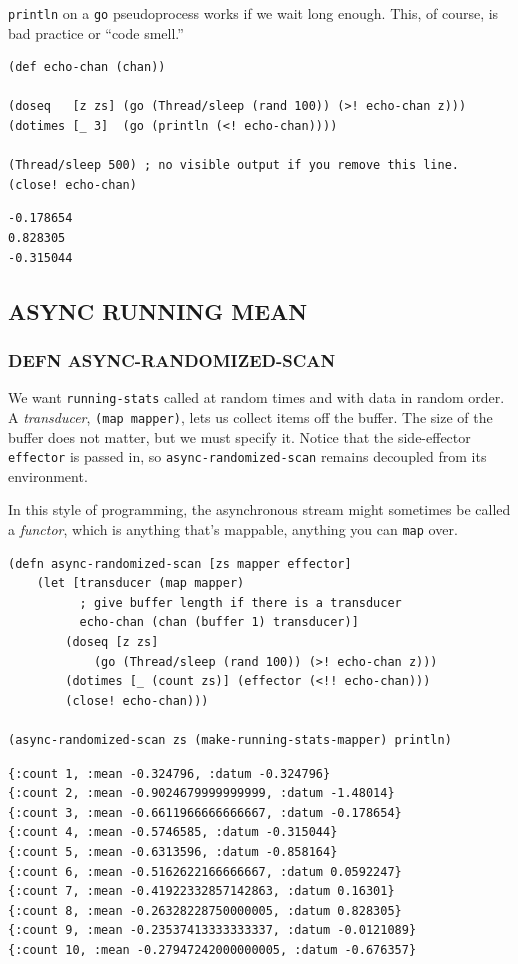 \documentclass[10pt,oneside,x11names]{article}
\begin{document}
\texttt{println} on a \texttt{go} pseudoprocess works if we wait long enough. This, of
course, is bad practice or ``code smell.''

\begin{verbatim}
(def echo-chan (chan))

(doseq   [z zs] (go (Thread/sleep (rand 100)) (>! echo-chan z)))
(dotimes [_ 3]  (go (println (<! echo-chan))))

(Thread/sleep 500) ; no visible output if you remove this line.
(close! echo-chan)
\end{verbatim}

\begin{verbatim}
-0.178654
0.828305
-0.315044
\end{verbatim}

\subsection{ASYNC RUNNING MEAN}
\label{async-running-mean}
\subsubsection{DEFN ASYNC-RANDOMIZED-SCAN}
\label{async-randomized-scan}
We want \texttt{running-stats} called at random times and with data in random
order. A \emph{transducer}, \texttt{(map mapper)}, lets us collect items off the
buffer. The size of the buffer does not matter, but we must specify it.
Notice that the side-effector \texttt{effector} is passed in, so
\texttt{async-randomized-scan} remains decoupled from its environment.

In this style of programming, the asynchronous stream might sometimes be
called a \emph{functor}, which is anything that's mappable, anything you can
\texttt{map} over.

\begin{verbatim}
(defn async-randomized-scan [zs mapper effector]
    (let [transducer (map mapper)
          ; give buffer length if there is a transducer
          echo-chan (chan (buffer 1) transducer)]
        (doseq [z zs]
            (go (Thread/sleep (rand 100)) (>! echo-chan z)))
        (dotimes [_ (count zs)] (effector (<!! echo-chan)))
        (close! echo-chan)))

(async-randomized-scan zs (make-running-stats-mapper) println)
\end{verbatim}

\begin{verbatim}
{:count 1, :mean -0.324796, :datum -0.324796}
{:count 2, :mean -0.9024679999999999, :datum -1.48014}
{:count 3, :mean -0.6611966666666667, :datum -0.178654}
{:count 4, :mean -0.5746585, :datum -0.315044}
{:count 5, :mean -0.6313596, :datum -0.858164}
{:count 6, :mean -0.5162622166666667, :datum 0.0592247}
{:count 7, :mean -0.41922332857142863, :datum 0.16301}
{:count 8, :mean -0.26328228750000005, :datum 0.828305}
{:count 9, :mean -0.23537413333333337, :datum -0.0121089}
{:count 10, :mean -0.27947242000000005, :datum -0.676357}
\end{verbatim}
\end{document}
